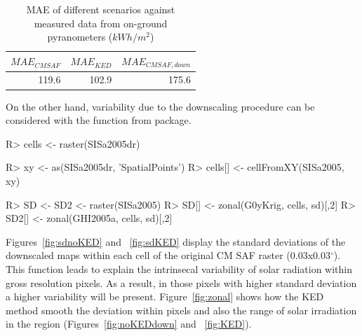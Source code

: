 \documentclass[article]{jss}
\begin{document}
\begin{table}[htb]
\caption{MAE of different scenarios against measured data from on-ground pyranometers ($kWh/m^2$)} \label{tab:MAE}
\begin{center}
\begin{tabular}{rrr}
 $MAE_{CM SAF}$  &  $MAE_{KED}$  &  $MAE_{CM SAF,down}$  \\
\hline
        119.6  &        102.9 &        175.6   \\
\end{tabular}
\end{center}
\end{table}


On the other hand, variability due to the downscaling procedure
can be considered with the  function from
 package.

\begin{CodeChunk}
\begin{CodeInput}
R> cells <- raster(SISa2005dr)

R> xy <- as(SISa2005dr, 'SpatialPoints')
R> cells[] <- cellFromXY(SISa2005, xy)

R> SD <- SD2 <- raster(SISa2005)
R> SD[] <- zonal(G0yKrig, cells, sd)[,2]
R> SD2[] <- zonal(GHI2005a, cells, sd)[,2]
\end{CodeInput}
\end{CodeChunk}

Figures~\ref{fig:sdnoKED} and ~\ref{fig:sdKED} display the
standard deviations of the downscaled maps within each cell of the
original CM SAF raster (0.03x0.03$^\circ$). This  function leads to explain the intrinsecal variability of solar radiation within gross resolution pixels. As a result, in those pixels with higher standard deviation a higher variability will be present.  Figure~\ref{fig:zonal}
shows how the KED method smooth the deviation within pixels and
also the range of solar irradiation in the region
(Figures~\ref{fig:noKEDdown} and ~\ref{fig:KED}).
\end{document}
